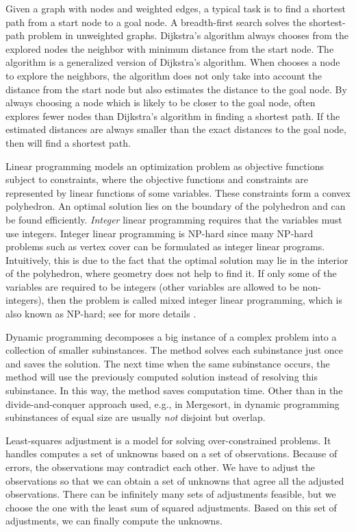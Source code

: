 Given a graph with nodes and weighted edges,
a typical task is to find a shortest path 
from a start node to a goal node.
A breadth-first search \parencite[]{Cormen2009}
solves the shortest-path problem 
in unweighted graphs.
Dijkstra's algorithm \parencite{Dijkstra1959}
always chooses from the explored nodes the neighbor 
with minimum distance from the start node. 
The \Astar algorithm is 
a generalized version of Dijkstra's algorithm.
When \Astar chooses a node to explore the neighbors,
the algorithm does not only take into account 
the distance from the start node
but also estimates the distance to the goal node.
By always choosing a node which is likely 
to be closer to the goal node, 
\Astar often explores fewer nodes than Dijkstra's algorithm
in finding a shortest path.
If the estimated distances are always smaller than the exact 
distances to the goal node, 
then \Astar will find a shortest path.

Linear programming models an optimization problem as objective 
functions subject to constraints,
where the objective functions and constraints are represented by 
linear functions of some variables.
These constraints form a convex polyhedron.
An optimal solution lies on the boundary of the polyhedron and 
can be found efficiently.
\emph{Integer} linear programming requires that
the variables must use integers.
Integer linear programming is NP-hard
since many NP-hard problems such as vertex cover can be 
formulated as integer linear programs.
Intuitively, this is due to the fact that the optimal solution 
may lie in the interior of the polyhedron, where geometry does 
not help to find it.
If only some of the variables are required to be integers
(other variables are allowed to be non-integers), 
then the problem is called mixed integer linear programming,
which is also known as NP-hard; see for more details
\textcite[]{Schrijver1986}.



Dynamic programming decomposes 
a big instance of a complex problem 
into a collection of smaller subinstances.
The method solves each subinstance just once 
and saves the solution. 
The next time when the same subinstance occurs, 
the method will use the previously computed solution 
instead of resolving this subinstance. 
In this way, the method saves computation time.
Other than in the divide-and-conquer approach used, 
e.g., in Mergesort, 
in dynamic programming subinstances of equal size 
are usually \emph{not} disjoint but overlap.

Least-squares adjustment is a model for solving 
over-constrained problems.  
It handles computes a set of unknowns 
based on a set of observations.
Because of errors, the observations may contradict each other.
We have to adjust the observations 
so that we can obtain a set of unknowns that agree 
all the adjusted observations.
There can be infinitely many sets of adjustments feasible, 
but we choose the one with the least sum of squared adjustments.
Based on this set of adjustments,
we can finally compute the unknowns.


